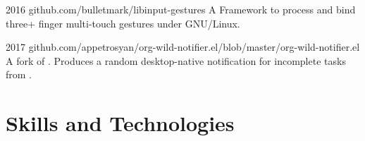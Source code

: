 \documentclass{CurriculumVitae}[10pt, draft, condensed]
\begin{document}
 {2016}
{github.com/bulletmark/libinput-gestures} {A Framework to process and
  bind three+ finger multi-touch gestures under GNU/Linux. }

 {2017}
{github.com/appetrosyan/org-wild-notifier.el/blob/master/org-wild-notifier.el}
{A fork of . Produces a random desktop-native
  notification for incomplete tasks from . }



\section*{Skills and Technologies}

\begin{multicols}{4}
  

\end{multicols}
\end{document}

